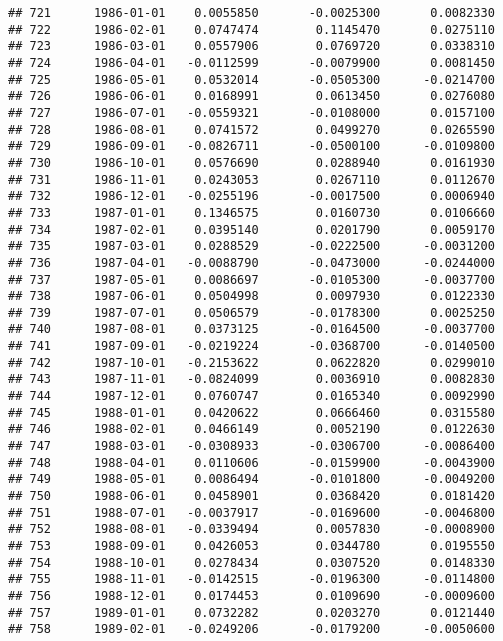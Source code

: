 \documentclass[
]{article}
\begin{document}
\begin{verbatim}
## 721      1986-01-01    0.0055850       -0.0025300       0.0082330
## 722      1986-02-01    0.0747474        0.1145470       0.0275110
## 723      1986-03-01    0.0557906        0.0769720       0.0338310
## 724      1986-04-01   -0.0112599       -0.0079900       0.0081450
## 725      1986-05-01    0.0532014       -0.0505300      -0.0214700
## 726      1986-06-01    0.0168991        0.0613450       0.0276080
## 727      1986-07-01   -0.0559321       -0.0108000       0.0157100
## 728      1986-08-01    0.0741572        0.0499270       0.0265590
## 729      1986-09-01   -0.0826711       -0.0500100      -0.0109800
## 730      1986-10-01    0.0576690        0.0288940       0.0161930
## 731      1986-11-01    0.0243053        0.0267110       0.0112670
## 732      1986-12-01   -0.0255196       -0.0017500       0.0006940
## 733      1987-01-01    0.1346575        0.0160730       0.0106660
## 734      1987-02-01    0.0395140        0.0201790       0.0059170
## 735      1987-03-01    0.0288529       -0.0222500      -0.0031200
## 736      1987-04-01   -0.0088790       -0.0473000      -0.0244000
## 737      1987-05-01    0.0086697       -0.0105300      -0.0037700
## 738      1987-06-01    0.0504998        0.0097930       0.0122330
## 739      1987-07-01    0.0506579       -0.0178300       0.0025250
## 740      1987-08-01    0.0373125       -0.0164500      -0.0037700
## 741      1987-09-01   -0.0219224       -0.0368700      -0.0140500
## 742      1987-10-01   -0.2153622        0.0622820       0.0299010
## 743      1987-11-01   -0.0824099        0.0036910       0.0082830
## 744      1987-12-01    0.0760747        0.0165340       0.0092990
## 745      1988-01-01    0.0420622        0.0666460       0.0315580
## 746      1988-02-01    0.0466149        0.0052190       0.0122630
## 747      1988-03-01   -0.0308933       -0.0306700      -0.0086400
## 748      1988-04-01    0.0110606       -0.0159900      -0.0043900
## 749      1988-05-01    0.0086494       -0.0101800      -0.0049200
## 750      1988-06-01    0.0458901        0.0368420       0.0181420
## 751      1988-07-01   -0.0037917       -0.0169600      -0.0046800
## 752      1988-08-01   -0.0339494        0.0057830      -0.0008900
## 753      1988-09-01    0.0426053        0.0344780       0.0195550
## 754      1988-10-01    0.0278434        0.0307520       0.0148330
## 755      1988-11-01   -0.0142515       -0.0196300      -0.0114800
## 756      1988-12-01    0.0174453        0.0109690      -0.0009600
## 757      1989-01-01    0.0732282        0.0203270       0.0121440
## 758      1989-02-01   -0.0249206       -0.0179200      -0.0050600

\end{verbatim}
\end{document}
